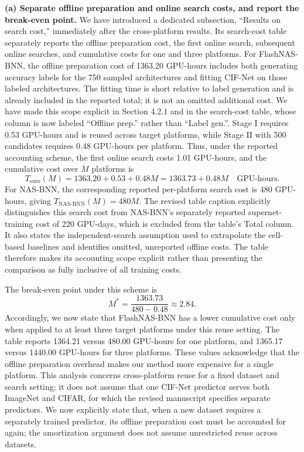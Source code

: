 \documentclass[11pt]{article}
\begin{document}
\begin{enumerate}[leftmargin=0pt,label={},itemsep=5mm]
\textbf{(a) Separate offline preparation and online search costs, and report the break-even point.} We have introduced a dedicated subsection, ``Results on search cost,'' immediately after the cross-platform results. Its search-cost table separately reports the offline preparation cost, the first online search, subsequent online searches, and cumulative costs for one and three platforms. For FlashNAS-BNN, the offline preparation cost of 1363.20 GPU-hours includes both generating accuracy labels for the 750 sampled architectures and fitting CIF-Net on those labeled architectures. The fitting time is short relative to label generation and is already included in the reported total; it is not an omitted additional cost. We have made this scope explicit in Section 4.2.1 and in the search-cost table, whose column is now labeled ``Offline prep.'' rather than ``Label gen.''. Stage I requires 0.53 GPU-hours and is reused across target platforms, while Stage II with 500 candidates requires 0.48 GPU-hours per platform. Thus, under the reported accounting scheme, the first online search costs 1.01 GPU-hours, and the cumulative cost over $M$ platforms is
\[
T_{\mathrm{ours}}(M)=1363.20+0.53+0.48M
                       =1363.73+0.48M\quad\text{GPU-hours}.
\]
For NAS-BNN, the corresponding reported per-platform search cost is 480 GPU-hours, giving $T_{\mathrm{NAS\text{-}BNN}}(M)=480M$. The revised table caption explicitly distinguishes this search cost from NAS-BNN's separately reported supernet-training cost of 220 GPU-days, which is excluded from the table's Total column. It also states the independent-search assumption used to extrapolate the cell-based baselines and identifies omitted, unreported offline costs. The table therefore makes its accounting scope explicit rather than presenting the comparison as fully inclusive of all training costs.

The break-even point under this scheme is
\[
M^{*}=\frac{1363.73}{480-0.48}\approx2.84.
\]
Accordingly, we now state that FlashNAS-BNN has a lower cumulative cost only when applied to at least three target platforms under this reuse setting. The table reports 1364.21 versus 480.00 GPU-hours for one platform, and 1365.17 versus 1440.00 GPU-hours for three platforms. These values acknowledge that the offline preparation overhead makes our method more expensive for a single platform. This analysis concerns cross-platform reuse for a fixed dataset and search setting; it does not assume that one CIF-Net predictor serves both ImageNet and CIFAR, for which the revised manuscript specifies separate predictors. We now explicitly state that, when a new dataset requires a separately trained predictor, its offline preparation cost must be accounted for again; the amortization argument does not assume unrestricted reuse across datasets.


\end{enumerate}
\end{document}
